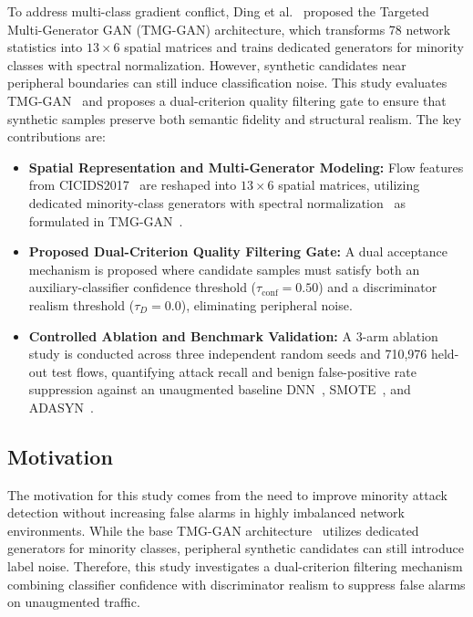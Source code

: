 \documentclass[conference]{IEEEtran}
\begin{document}
To address multi-class gradient conflict, Ding et al.~\cite{ding2024tmggan} proposed the Targeted Multi-Generator GAN (TMG-GAN) architecture, which transforms 78 network statistics into $13 \times 6$ spatial matrices and trains dedicated generators for minority classes with spectral normalization. However, synthetic candidates near peripheral boundaries can still induce classification noise. This study evaluates TMG-GAN~\cite{ding2024tmggan} and proposes a dual-criterion quality filtering gate to ensure that synthetic samples preserve both semantic fidelity and structural realism. The key contributions are:

\begin{itemize}\setlength{\itemsep}{2pt}\setlength{\topsep}{2pt}\setlength{\parsep}{0pt}
    \item \textbf{Spatial Representation and Multi-Generator Modeling:} Flow features from CICIDS2017~\cite{sharafaldin2018toward} are reshaped into $13 \times 6$ spatial matrices, utilizing dedicated minority-class generators with spectral normalization~\cite{miyato2018spectral} as formulated in TMG-GAN~\cite{ding2024tmggan}.
    \item \textbf{Proposed Dual-Criterion Quality Filtering Gate:} A dual acceptance mechanism is proposed where candidate samples must satisfy both an auxiliary-classifier confidence threshold ($\tau_{\text{conf}} = 0.50$) and a discriminator realism threshold ($\tau_D = 0.0$), eliminating peripheral noise.
    \item \textbf{Controlled Ablation and Benchmark Validation:} A 3-arm ablation study is conducted across three independent random seeds and 710,976 held-out test flows, quantifying attack recall and benign false-positive rate suppression against an unaugmented baseline DNN~\cite{lecun2015deeplearning}, SMOTE~\cite{chawla2002smote}, and ADASYN~\cite{he2008adasyn}.
\end{itemize}

\subsection{Motivation}

The motivation for this study comes from the need to improve minority attack detection without increasing false alarms in highly imbalanced network environments. While the base TMG-GAN architecture~\cite{ding2024tmggan} utilizes dedicated generators for minority classes, peripheral synthetic candidates can still introduce label noise. Therefore, this study investigates a dual-criterion filtering mechanism combining classifier confidence with discriminator realism to suppress false alarms on unaugmented traffic.
\end{document}
